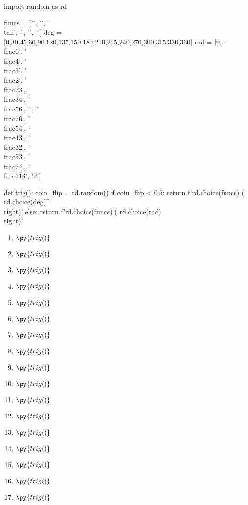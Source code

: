 \documentclass{article}
\begin{document}
\begin{pycode}
import random as rd

funcs = ['\sin', '\cos', '\\tan', '\csc', '\cot', '\sec']
deg = [0,30,45,60,90,120,135,150,180,210,225,240,270,300,315,330,360]
rad = [0, '\\frac{\pi}{6}', '\\frac{\pi}{4}', '\\frac{\pi}{3}', '\\frac{\pi}{2}', 
        '\\frac{2\pi}{3}', '\\frac{3\pi}{4}', '\\frac{5\pi}{6}', '\pi', 
        '\\frac{7\pi}{6}', '\\frac{5\pi}{4}', '\\frac{4\pi}{3}', '\\frac{3\pi}{2}', 
        '\\frac{5\pi}{3}', '\\frac{7\pi}{4}', '\\frac{11\pi}{6}', '2\pi']

def trig():
    coin_flip = rd.random()
    if coin_flip < 0.5:
        return f'{rd.choice(funcs)} \left( {rd.choice(deg)}^\circ \\right)'
    else:
        return f'{rd.choice(funcs)} \left( {rd.choice(rad)} \\right)'
\end{pycode}

\begin{enumerate}
    \item $\py{trig()}$
    \item $\py{trig()}$
    \item $\py{trig()}$
    \item $\py{trig()}$
    \item $\py{trig()}$
    \item $\py{trig()}$
    \item $\py{trig()}$
    \item $\py{trig()}$
    \item $\py{trig()}$
    \item $\py{trig()}$
    \item $\py{trig()}$
    \item $\py{trig()}$
    \item $\py{trig()}$
    \item $\py{trig()}$
    \item $\py{trig()}$
    \item $\py{trig()}$
    \item $\py{trig()}$
\end{enumerate}
\end{document}
